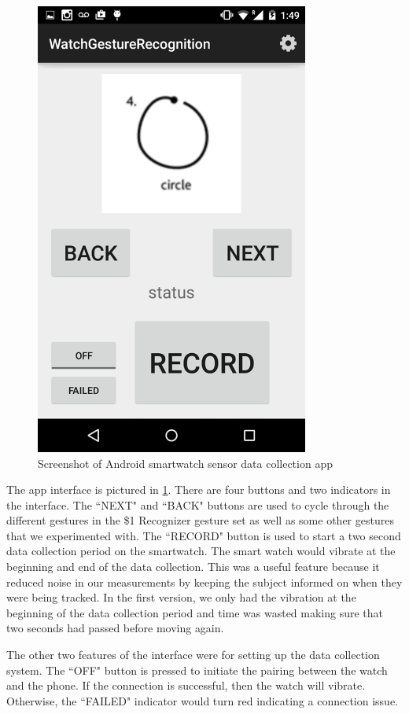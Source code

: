 \documentclass{report}
\begin{document}
\begin{figure}[ht!]
  \label{app}
  \centering
  \includegraphics[width=90mm]{app}
  \caption{Screenshot of Android smartwatch sensor data collection app}
\end{figure}

The app interface is pictured in \ref{app}. There are four buttons and two indicators in the interface. The ``NEXT" and ``BACK" buttons are used to cycle through the different gestures in the \$1 Recognizer gesture set as well as some other gestures that we experimented with. The ``RECORD" button is used to start a two second data collection period on the smartwatch. The smart watch would vibrate at the beginning and end of the data collection. This was a useful feature because it reduced noise in our measurements by keeping the subject informed on when they were being tracked. In the first version, we only had the vibration at the beginning of the data collection period and time was wasted making sure that two seconds had passed before moving again.

The other two features of the interface were for setting up the data collection system. The ``OFF" button is pressed to initiate the pairing between the watch and the phone. If the connection is successful, then the watch will vibrate. Otherwise, the ``FAILED" indicator would turn red indicating a connection issue.
\end{document}
